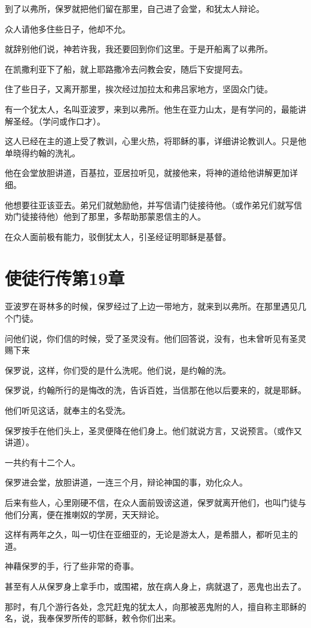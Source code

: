 \documentclass[12pt,oneside]{book}
\begin{document}
到了以弗所，保罗就把他们留在那里，自己进了会堂，和犹太人辩论。

众人请他多住些日子，他却不允。

就辞别他们说，神若许我，我还要回到你们这里。于是开船离了以弗所。

在凯撒利亚下了船，就上耶路撒冷去问教会安，随后下安提阿去。

住了些日子，又离开那里，挨次经过加拉太和弗吕家地方，坚固众门徒。

有一个犹太人，名叫亚波罗，来到以弗所。他生在亚力山太，是有学问的，最能讲解圣经。（学问或作口才）。

这人已经在主的道上受了教训，心里火热，将耶稣的事，详细讲论教训人。只是他单晓得约翰的洗礼。

他在会堂放胆讲道，百基拉，亚居拉听见，就接他来，将神的道给他讲解更加详细。

他想要往亚该亚去。弟兄们就勉励他，并写信请门徒接待他。（或作弟兄们就写信劝门徒接待他）他到了那里，多帮助那蒙恩信主的人。

在众人面前极有能力，驳倒犹太人，引圣经证明耶稣是基督。

\chapter{使徒行传第19章}
亚波罗在哥林多的时候，保罗经过了上边一带地方，就来到以弗所。在那里遇见几个门徒。

问他们说，你们信的时候，受了圣灵没有。他们回答说，没有，也未曾听见有圣灵赐下来

保罗说，这样，你们受的是什么洗呢。他们说，是约翰的洗。

保罗说，约翰所行的是悔改的洗，告诉百姓，当信那在他以后要来的，就是耶稣。

他们听见这话，就奉主的名受洗。

保罗按手在他们头上，圣灵便降在他们身上。他们就说方言，又说预言。（或作又讲道）。

一共约有十二个人。

保罗进会堂，放胆讲道，一连三个月，辩论神国的事，劝化众人。

后来有些人，心里刚硬不信，在众人面前毁谤这道，保罗就离开他们，也叫门徒与他们分离，便在推喇奴的学房，天天辩论。

这样有两年之久，叫一切住在亚细亚的，无论是游太人，是希腊人，都听见主的道。

神藉保罗的手，行了些非常的奇事。

甚至有人从保罗身上拿手巾，或围裙，放在病人身上，病就退了，恶鬼也出去了。

那时，有几个游行各处，念咒赶鬼的犹太人，向那被恶鬼附的人，擅自称主耶稣的名，说，我奉保罗所传的耶稣，敕令你们出来。
\end{document}
